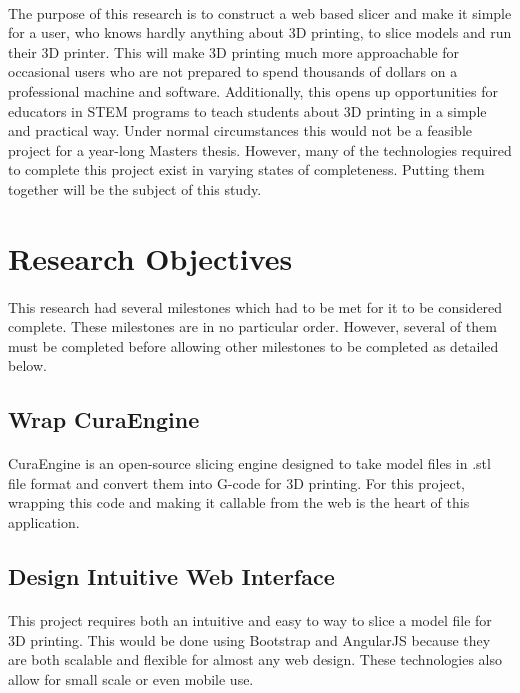 \paragraph{}
The purpose of this research is to construct a web based slicer and make it simple for a user, who knows hardly anything about 3D printing, to slice models and run their 3D printer.
This will make 3D printing much more approachable for occasional users who are not prepared to spend thousands of dollars on a professional machine and software.
Additionally, this opens up opportunities for educators in STEM programs to teach students about 3D printing in a simple and practical way.
Under normal circumstances this would not be a feasible project for a year-long Masters thesis.
However, many of the technologies required to complete this project exist in varying states of completeness.
Putting them together will be the subject of this study.


\section{Research Objectives}
\paragraph{}
This research had several milestones which had to be met for it to be considered complete.
These milestones are in no particular order.
However, several of them must be completed before allowing other milestones to be completed as detailed below.

\subsection{Wrap CuraEngine}
\paragraph{}
CuraEngine is an open-source slicing engine designed to take model files in .stl file format and convert them into G-code for 3D printing.
For this project, wrapping this code and making it callable from the web is the heart of this application.

\subsection{Design Intuitive Web Interface}
\paragraph{}
This project requires both an intuitive and easy to way to slice a model file for 3D printing.
This would be done using Bootstrap and AngularJS because they are both scalable and flexible for almost any web design.
These technologies also allow for small scale or even mobile use.

